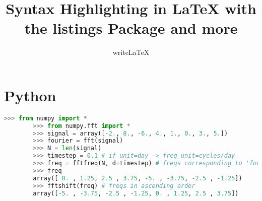 \documentclass[12pt]{article}
\title{Syntax Highlighting in LaTeX with the listings Package and more}
\author{writeLaTeX}
\begin{document}
	
	\maketitle
	

	
	\section{Python}
	\begin{lstlisting}[language=Python]
		>>> from numpy import *
		>>> from numpy.fft import *
		>>> signal = array([-2., 8., -6., 4., 1., 0., 3., 5.])
		>>> fourier = fft(signal)
		>>> N = len(signal)
		>>> timestep = 0.1 # if unit=day -> freq unit=cycles/day
		>>> freq = fftfreq(N, d=timestep) # freqs corresponding to 'fourier'
		>>> freq
		array([ 0. , 1.25, 2.5 , 3.75, -5. , -3.75, -2.5 , -1.25])
		>>> fftshift(freq) # freqs in ascending order
		array([-5. , -3.75, -2.5 , -1.25, 0. , 1.25, 2.5 , 3.75])
	\end{lstlisting}
	

	
\end{document}
